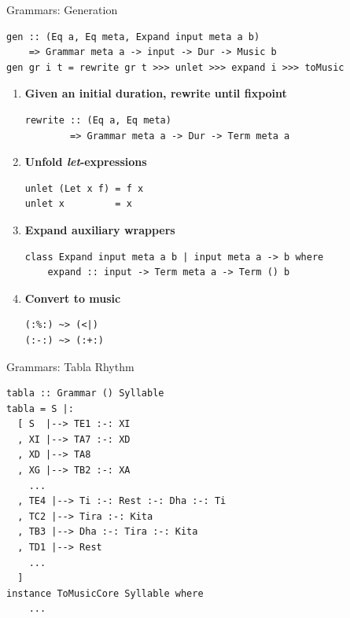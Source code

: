 \documentclass{beamer}
\begin{document}
	\begin{frame}[fragile=singleslide]{Grammars: Generation}

    	\begin{verbatim}
gen :: (Eq a, Eq meta, Expand input meta a b)
    => Grammar meta a -> input -> Dur -> Music b
gen gr i t = rewrite gr t >>> unlet >>> expand i >>> toMusic
	\end{verbatim}


	\begin{enumerate}	
	
	\item \textbf{Given an initial duration, rewrite until fixpoint}
	\begin{verbatim}
rewrite :: (Eq a, Eq meta)
        => Grammar meta a -> Dur -> Term meta a
	\end{verbatim}
	
	\item \textbf{Unfold \textit{let}-expressions}
	\begin{verbatim}
unlet (Let x f) = f x
unlet x         = x
	\end{verbatim}
	
	\item \textbf{Expand auxiliary wrappers}
	\begin{verbatim}
class Expand input meta a b | input meta a -> b where
    expand :: input -> Term meta a -> Term () b
	\end{verbatim}
	
	\item \textbf{Convert to music}
	\begin{verbatim}
(:%:) ~> (<|)
(:-:) ~> (:+:)
	\end{verbatim}
		
	\end{enumerate}
	\end{frame}	
	
	\begin{frame}[fragile=singleslide]{Grammars: Tabla Rhythm}
	\begin{verbatim}
tabla :: Grammar () Syllable
tabla = S |:
  [ S  |--> TE1 :-: XI
  , XI |--> TA7 :-: XD
  , XD |--> TA8
  , XG |--> TB2 :-: XA
    ...
  , TE4 |--> Ti :-: Rest :-: Dha :-: Ti
  , TC2 |--> Tira :-: Kita
  , TB3 |--> Dha :-: Tira :-: Kita
  , TD1 |--> Rest
    ...
  ]
instance ToMusicCore Syllable where
    ...
	\end{verbatim}
	\end{frame}
	
\end{document}
